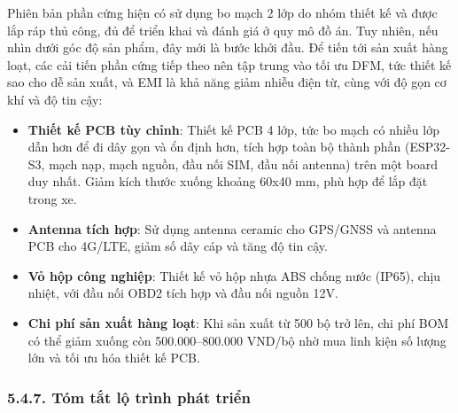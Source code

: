 \documentclass[a4paper]{extarticle}
\providecommand{\tightlist}{%
  \setlength{\itemsep}{0pt}\setlength{\parskip}{0pt}}
\begin{document}
Phiên bản phần cứng hiện có sử dụng bo mạch 2 lớp do nhóm thiết kế và
được lắp ráp thủ công, đủ để triển khai và đánh giá ở quy mô đồ án. Tuy
nhiên, nếu nhìn dưới góc độ sản phẩm, đây mới là bước khởi đầu. Để tiến
tới sản xuất hàng loạt, các cải tiến phần cứng tiếp theo nên tập trung
vào tối ưu DFM, tức thiết kế sao cho dễ sản xuất, và EMI là khả năng giảm
nhiễu điện từ, cùng với độ gọn cơ khí và độ tin cậy:

\begin{itemize}
\tightlist
\item
  \textbf{Thiết kế PCB tùy chỉnh}: Thiết kế PCB 4 lớp, tức bo mạch có
  nhiều lớp dẫn hơn để đi dây gọn và ổn định hơn, tích hợp
  toàn bộ thành phần (ESP32-S3, mạch nạp, mạch nguồn, đầu nối SIM, đầu
  nối antenna) trên một board duy nhất. Giảm kích thước xuống khoảng
  60x40 mm, phù hợp để lắp đặt trong xe.
\item
  \textbf{Antenna tích hợp}: Sử dụng antenna ceramic cho GPS/GNSS và
  antenna PCB cho 4G/LTE, giảm số dây cáp và tăng độ tin cậy.
\item
  \textbf{Vỏ hộp công nghiệp}: Thiết kế vỏ hộp nhựa ABS chống nước
  (IP65), chịu nhiệt, với đầu nối OBD2 tích hợp và đầu nối nguồn 12V.
\item
  \textbf{Chi phí sản xuất hàng loạt}: Khi sản xuất từ 500 bộ trở lên,
  chi phí BOM có thể giảm xuống còn 500.000--800.000 VND/bộ nhờ mua linh
  kiện số lượng lớn và tối ưu hóa thiết kế PCB.
\end{itemize}

\subsubsection{5.4.7. Tóm tắt lộ trình phát
triển}\label{547-tuxf3m-tux1eaft-lux1ed9-truxecnh-phuxe1t-triux1ec3n}
\end{document}
